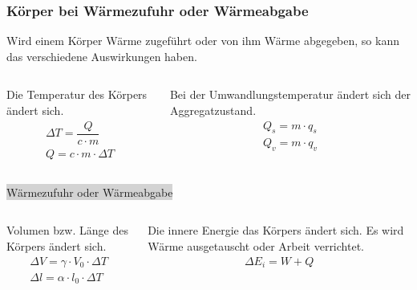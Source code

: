 \documentclass{beamer}
\begin{document}
\frame
{
  \frametitle{Körper bei Wärmezufuhr oder Wärmeabgabe}
	\begin{scriptsize}	
	Wird einem Körper Wärme zugeführt oder von ihm Wärme abgegeben, so kann das verschiedene Auswirkungen haben.
	\begin{columns}
		\begin{column}{0.5\textwidth}
   			\begin{tcolorbox}
   			Die Temperatur des Körpers ändert sich.
	  		\begin{align*}
	  		&\Delta T=\dfrac{Q}{c\cdot m}\\
	  		&Q=c\cdot m\cdot\Delta T&
	  		\end{align*}
			\end{tcolorbox}
		\end{column}
		\begin{column}{0.5\textwidth}
     		\begin{tcolorbox}
	  		Bei der Umwandlungstemperatur ändert sich der Aggregatzustand.
	  		\begin{align*}
	  		&Q_s=m\cdot q_s\\
	  		&Q_v=m\cdot q_v&
	  		\end{align*}
			\end{tcolorbox}
   		\end{column}
		\end{columns}
			\vspace{0.3cm}	  		
	  		\centering \colorbox{lightgray}{{\normalsize Wärmezufuhr oder Wärmeabgabe}}
	\begin{columns}
		\begin{column}{0.5\textwidth}
   			\begin{tcolorbox}
	  		Volumen bzw. Länge des Körpers ändert sich.
	  		\begin{align*}
	  		&\Delta V=\gamma\cdot V_0\cdot\Delta T\\
	  		&\Delta l=\alpha\cdot l_0\cdot\Delta T&
	  		\end{align*}	  		
			\end{tcolorbox}
		\end{column}
		\begin{column}{0.5\textwidth}
     		\begin{tcolorbox}
	  		Die innere Energie das Körpers ändert sich. Es wird Wärme ausgetauscht oder Arbeit verrichtet.
	  		\begin{align*}
	  		&\Delta E_i=W+Q&
	  		\end{align*}   		
			\end{tcolorbox}
   		\end{column}
	\end{columns}
	\end{scriptsize}
}
\end{document}
